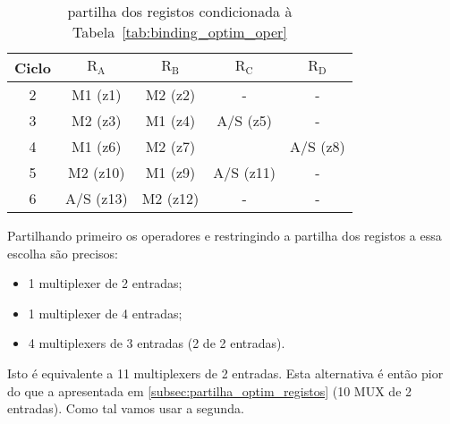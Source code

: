 \documentclass[a4paper]{article}
\begin{document}
\begin{table}[H]
\centering
\begin{tabular}{|c||c|c|c|c|}
\hline 
Ciclo & $\mathrm{R_A}$ & $\mathrm{R_B}$ & $\mathrm{R_C}$ & $\mathrm{R_D}$ \\ 
\hline 
\hline
2 & M1 (z1) & M2 (z2) & - & - \\ 
\hline 
3 & M2 (z3) & M1 (z4) & A/S (z5) & - \\ 
\cline{1-3}\cline{5-5}
4 & M1 (z6) & M2 (z7) &  & A/S (z8) \\ 
\hline 
5 & M2 (z10) & M1 (z9) & A/S (z11) & - \\ 
\hline 
6 & A/S (z13) & M2 (z12) & - & - \\ 
\hline 
\end{tabular}
\caption{partilha dos registos condicionada à Tabela~\ref{tab:binding_optim_oper}}
\label{tab:binding_reg}
\end{table}

Partilhando primeiro os operadores e restringindo a partilha dos registos a essa escolha são precisos:
\begin{itemize}
\item 1 multiplexer de 2 entradas;
\item 1 multiplexer de 4 entradas;
\item 4 multiplexers de 3 entradas (2 de 2 entradas).
\end{itemize}
Isto é equivalente a 11 multiplexers de 2 entradas. Esta alternativa é então pior do que a apresentada em \ref{subsec:partilha_optim_registos} (10 MUX de 2 entradas). Como tal vamos usar a segunda.
\end{document}
